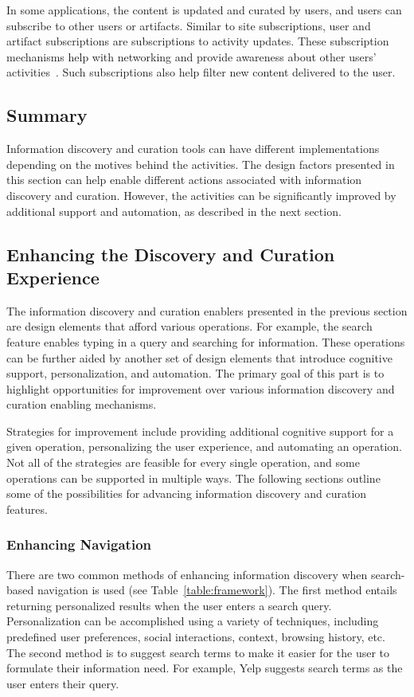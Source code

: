 \documentclass{sigchi}
\newcommand{\feature}[1]{{\ttfamily#1}}
\begin{document}
{{{In some applications, the content is updated and curated by users, and users can \feature{subscribe} to other \feature{users} or \feature{artifacts}. Similar to site subscriptions, user and artifact subscriptions are subscriptions to activity updates. These subscription mechanisms help with networking and provide awareness about other users' activities~\cite{millen2005social}. Such subscriptions also help filter new content delivered to the user. 
} %
} %

{\subsection{Summary}
Information discovery and curation tools can have different implementations depending on the motives behind the activities. The design factors presented in this section can help enable different actions associated with information discovery and curation. However, the activities can be significantly improved by additional support and automation, as described in the next section.

} %

{\subsection{Enhancing the Discovery and Curation Experience}


The information discovery and curation enablers presented in the previous section are design elements that afford various operations. For example, the search feature enables typing in a query and searching for information. These operations can be further aided by another set of design elements that introduce cognitive support, personalization, and automation. The primary goal of this part is to highlight opportunities for improvement over various information discovery and curation enabling mechanisms.

Strategies for improvement include providing additional cognitive support for a given operation, personalizing the user experience, and automating an operation. Not all of the strategies are feasible for every single operation, and some operations can be supported in multiple ways. The following sections outline some of the possibilities for advancing information discovery and curation features. 

{\subsubsection{Enhancing Navigation}
There are two common methods of enhancing information discovery when search-based navigation is used (see Table~\ref{table:framework}). The first method entails returning personalized results when the user enters a search query. \feature{Personalization} can be accomplished using a variety of techniques, including predefined user preferences, social interactions, context, browsing history, etc. The second method is to \feature{suggest search terms} to make it easier for the user to formulate their information need. For example, Yelp suggests search terms as the user enters their query.

}}}
\end{document}
